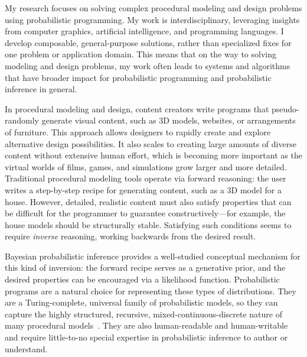 \documentclass[
10pt, %
a4paper, %
oneside, %
headinclude,footinclude, %
BCOR5mm, %
]{scrartcl}
\title{\normalfont\spacedallcaps{Daniel Ritchie}} %
\author{\spacedallcaps{Research Statement}} %
\date{} %
\begin{document}

\pagestyle{scrheadings}
\clearscrheadings
\newcommand{\headertext}{\spacedlowsmallcaps{\color{black} Daniel Ritchie \color{halfgray} Research Statement}}
\ohead{\headertext}
\cfoot[\pagemark]{\pagemark}


\maketitle

My research focuses on solving complex procedural modeling and design problems using probabilistic programming. My work is interdisciplinary, leveraging insights from computer graphics, artificial intelligence, and programming languages. I develop composable, general-purpose solutions, rather than specialized fixes for one problem or application domain. This means that on the way to solving modeling and design problems, my work often leads to systems and algorithms that have broader impact for probabilistic programming and probabilistic inference in general.

In procedural modeling and design, content creators write programs that pseudo-randomly generate visual content, such as 3D models, websites, or arrangements of furniture. This approach allows designers to rapidly create and explore alternative design possibilities. It also scales to creating large amounts of diverse content without extensive human effort, which is becoming more important as the virtual worlds of films, games, and simulations grow larger and more detailed. Traditional procedural modeling tools operate via forward reasoning: the user writes a step-by-step recipe for generating content, such as a 3D model for a house. However, detailed, realistic content must also satisfy properties that can be difficult for the programmer to guarantee constructively---for example, the house models should be structurally stable. Satisfying such conditions seems to require \emph{inverse} reasoning, working backwards from the desired result.

Bayesian probabilistic inference provides a well-studied conceptual mechanism for this kind of inversion: the forward recipe serves as a generative prior, and the desired properties can be encouraged via a likelihood function. Probabilistic programs are a natural choice for representing these types of distributions. They are a Turing-complete, universal family of probabilistic models, so they can capture the highly structured, recursive, mixed-continuous-discrete nature of many procedural models~\cite{Church}. They are also human-readable and human-writable and require little-to-no special expertise in probabilistic inference to author or understand.
\end{document}
